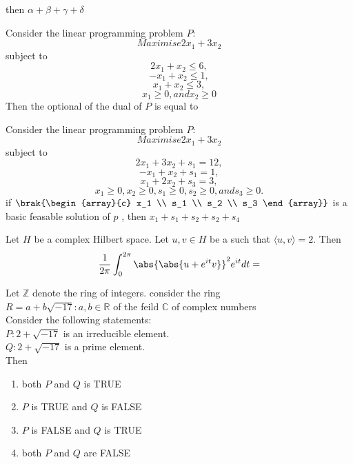 then $\alpha + \beta + \gamma + \delta$
\item Consider the linear programming problem $P$:
\begin{equation}
Maximise  2x_1+3x_2\end{equation}
subject to
\begin{equation}
    2x_1+x_2 \leq 6,
\end{equation}
\begin{equation}
    -x_1+x_2\leq 1, 
\end{equation}
\begin{equation}
    x_1+x_2\leq 3,
\end{equation}
\begin{equation}
    x_1\geq 0, and  x_2\geq 0
\end{equation}
Then the optional of the dual of $P$ is equal to 
\item Consider the linear programming problem $P$:
\begin{equation}
Maximise  2x_1+3x_2\end{equation}
subject to
\begin{equation}
    2x_1+3x_2+s_1=12,
\end{equation}
\begin{equation}
    -x_1+x_2+s_1= 1, 
\end{equation}
\begin{equation}
    x_1+2x_2+s_3=3,
\end{equation}
\begin{equation}
    x_1\geq 0,x_2\geq 0, s_1\geq 0,s_2\geq 0, and s_3\geq 0.
\end{equation}
if $\brak{\begin{array}{c}
x_1 \\
s_1 \\
s_2 \\
s_3
\end{array}}$ is a basic feasable solution of $p$ , then $x_1+s_1+s_2+s_2+s_4$
\item Let $H$ be a complex Hilbert space. Let $u,v\in H$ be a such that $\langle u, v \rangle=2$. Then 
\begin{equation}
    \frac{1}{2\pi}\int_{0}^{2\pi} \abs {\abs {u+e^{it}v}}^2 e^{it}dt=
\end{equation}
\item Let $\mathbb{Z}$ denote the ring of integers. consider the ring\\
$R={a+b\sqrt{-17}: a,b \in \mathbb{R}}$ of the feild $\mathbb{C}$ of complex numbers \\
Consider the following statements:\\
$P:2+\sqrt{-17}$ is an irreducible element.\\
$Q:2+\sqrt{-17}$ is a prime element.\\
Then
\begin{enumerate}
    \item both $P$ and $Q$ is TRUE
    \item $P$ is TRUE and $Q$ is FALSE
    \item $P$ is FALSE and $Q$ is TRUE
    \item both $P$ and $Q$ are FALSE
\end{enumerate}

